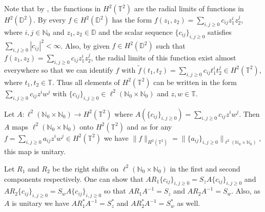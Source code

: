 \documentclass[12pt,reqno]{amsart}
\theoremstyle{definition}
\theoremstyle{definition}
\numberwithin{equation}{section}
\begin{document}

Note that by \cite{R85}, the functions in $H^2(\mathbb{T}^2)$ are the radial limits of functions in $H^2(\mathbb{D}^2)$. By \cite{M88,R69} every $f \in H^2(\mathbb{D}^2)$ has the form $f(z_1, z_2) = \underset{i,j \geq 0}{\sum} c_{ij} z_{1}^{i}z_{2}^{j}$, where $i, j \in \mathbb{N}_0$ and $z_1, z_2 \in \mathbb{D}$  and the scalar sequence $\{c_{ij}\}_{i, j \geq 0}$ satisfies  $\underset{i,j \geq 0}{\sum}|c_{ij}|^2 < \infty$. Also, by \cite{M88} given $f \in H^2(\mathbb{D}^2)$ such that $f(z_1, z_2) = \underset{i,j \geq 0}{\sum} c_{ij} z_{1}^{i}z_{2}^{j}$, the radial limits of this function exist almost everywhere so that we can identify $f$ with $\tilde{f}(t_1, t_2) = \underset{i,j \geq 0}{\sum} c_{ij} t_{1}^{i}t_{2}^{j} \in H^2(\mathbb{T}^2)$, where $t_1, t_2 \in \mathbb{T}$. Thus all elements of $H^2(\mathbb{T}^2)$ can be written in the form $\underset{i,j \geq 0}{\sum} c_{ij} z^{i}w^{j}$ with $\{c_{ij}\}_{i, j \geq 0} \in \ell^2(\mathbb{N}_0 \times \mathbb{N}_0)$ and $z, w \in \mathbb{T}$.




Let $A: \ell^2(\mathbb{N}_0 \times \mathbb{N}_0) \to H^2(\mathbb{T}^2)$ where $A(\{c_{ij}\}_{i, j \geq 0}) = \underset{i,j \geq 0}{\sum} c_{ij} z^{i}w^{j}$. Then $A$ maps $\ell^2(\mathbb{N}_0 \times \mathbb{N}_0)$ onto $H^2(\mathbb{T}^2)$ and as for any $ f = \underset{i,j \geq 0}{\sum} a_{ij} z^{i}w^{j}  \in H^2(\mathbb{T}^2)$ we have 
\newline
$\|f\|_{H^2(\mathbb{T}^2)} = \|\{a_{ij}\}_{i, j \geq 0}\|_{\ell^2(\mathbb{N}_0 \times \mathbb{N}_0)}$, this map is unitary. 

Let $R_1$ and $R_2$ be the right shifts on $\ell^2(\mathbb{N}_0 \times \mathbb{N}_0)$ in the first and second components respectively. One can show that 
\newline
$AR_1 \{c_{ij}\}_{i, j \geq 0} = S_z A \{c_{ij}\}_{i, j \geq 0}$ and $AR_2 \{c_{ij}\}_{i, j \geq 0} = S_w A \{c_{ij}\}_{i, j \geq 0}$ so that $AR_1A^{-1} = S_z$ and $AR_2A^{-1} = S_w$. Also, as $A$ is unitary we have $AR_1^{*}A^{-1} = S_z^{*}$ and $AR_2^{*}A^{-1} = S_w^{*}$ as well.
\end{document}
